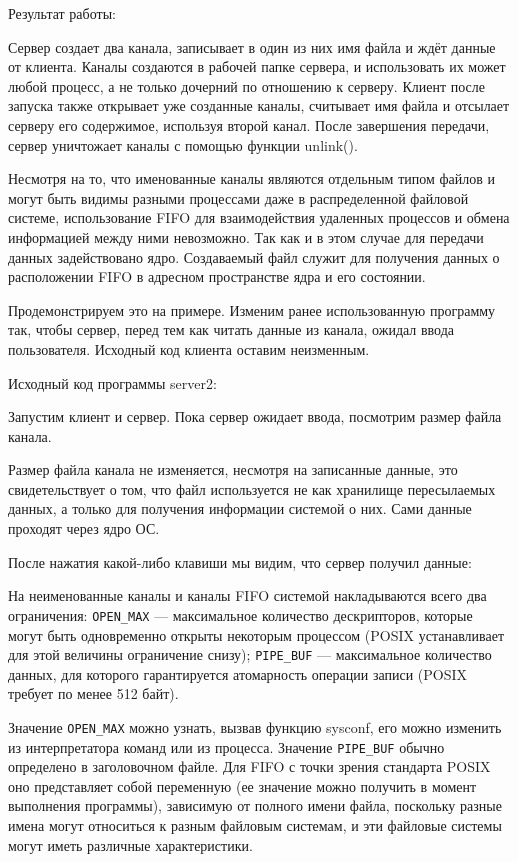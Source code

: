 \documentclass[a4paper]{article}
\begin{document}
	Результат работы:
	
	
	Сервер создает два канала, записывает в один из них имя файла и ждёт данные от клиента. Каналы создаются в рабочей папке сервера, и использовать их может любой процесс, а не только дочерний по отношению к серверу. Клиент после запуска также открывает уже созданные каналы, считывает имя файла и отсылает серверу его содержимое, используя второй канал. После завершения передачи, сервер уничтожает каналы с помощью функции unlink().
	
	Несмотря на то, что именованные каналы являются отдельным типом файлов и могут быть видимы разными процессами даже в распределенной файловой системе, использование FIFO для взаимодействия удаленных процессов и обмена информацией между ними невозможно. Так как и в этом случае для передачи данных задействовано ядро. Создаваемый файл служит для получения данных о расположении FIFO в адресном пространстве ядра и его состоянии.
	
	Продемонстрируем это на примере. Изменим ранее использованную программу так, чтобы сервер, перед тем как читать данные из канала, ожидал ввода пользователя. Исходный код клиента оставим неизменным.

	Исходный код программы server2:
	

	Запустим клиент и сервер. Пока сервер ожидает ввода, посмотрим размер файла канала.
	
 	
 	Размер файла канала не изменяется, несмотря на записанные данные, это свидетельствует о том, что файл используется не как хранилище пересылаемых данных, а только для получения информации системой о них. Сами данные проходят через ядро ОС.
 	
 	После нажатия какой-либо клавиши мы видим, что сервер получил данные:
	

	На неименованные каналы и каналы FIFO системой накладываются всего два ограничения: \texttt{OPEN\_MAX} --- максимальное количество дескрипторов, которые могут быть одновременно открыты некоторым процессом (POSIX устанавливает для этой величины ограничение снизу); \texttt{PIPE\_BUF} --- максимальное количество данных, для которого гарантируется атомарность операции записи (POSIX требует по менее 512 байт).
	
	Значение \texttt{OPEN\_MAX} можно узнать, вызвав функцию sysconf, его можно изменить из интерпретатора команд или из процесса. Значение \texttt{PIPE\_BUF} обычно определено в заголовочном файле. Для FIFO с точки зрения стандарта POSIX оно представляет собой переменную (ее значение можно получить в момент выполнения программы), зависимую от полного имени файла, поскольку разные имена могут относиться к разным файловым системам, и эти файловые системы могут иметь различные характеристики.
\end{document}
